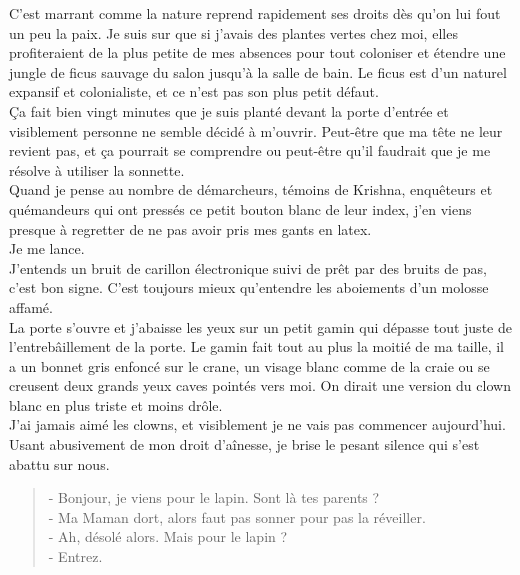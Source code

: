C'est marrant comme la nature reprend rapidement ses droits dès qu'on lui fout un peu la paix. Je suis sur que si j'avais des plantes vertes chez moi, elles profiteraient de la plus petite de mes absences pour tout coloniser et étendre une jungle de ficus sauvage du salon jusqu'à la salle de bain. Le ficus est d'un naturel expansif et colonialiste, et ce n'est pas son plus petit défaut. \\

Ça fait bien vingt minutes que je suis planté devant la porte d'entrée et visiblement personne ne semble décidé à m'ouvrir. Peut-être que ma tête ne leur revient pas, et ça pourrait se comprendre ou peut-être qu'il faudrait que je me résolve à utiliser la sonnette.\\
Quand je pense au nombre de démarcheurs, témoins de Krishna, enquêteurs et quémandeurs qui ont pressés ce petit bouton blanc de leur index, j'en viens presque à regretter de ne pas avoir pris mes gants en latex. \\

Je me lance.\\

J'entends un bruit de carillon électronique suivi de prêt par des bruits de pas, c'est bon signe. C'est toujours mieux qu'entendre les aboiements d'un molosse affamé. \\

La porte s'ouvre et j'abaisse les yeux sur un petit gamin qui dépasse tout juste de l’entrebâillement de la porte. Le gamin fait tout au plus la moitié de ma taille, il a un bonnet gris enfoncé sur le crane, un visage blanc comme de la craie ou se creusent deux grands yeux caves pointés vers moi. On dirait une version du clown blanc en plus triste et moins drôle. \\
J'ai jamais aimé les clowns, et visiblement je ne vais pas commencer aujourd'hui. \\

Usant abusivement de mon droit d’aînesse, je brise le pesant silence qui s'est abattu sur nous. \\

\begin{quote}
- Bonjour, je viens pour le lapin. Sont là tes parents ? \\
- Ma Maman dort, alors faut pas sonner pour pas la réveiller. \\
- Ah, désolé alors. Mais pour le lapin ? \\
- Entrez. \\
\end{quote}

